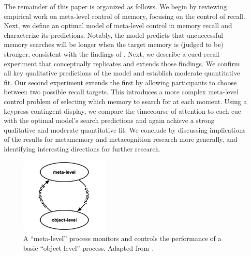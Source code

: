 The remainder of this paper is organized as follows. We begin by reviewing empirical work on meta-level control of memory, focusing on the control of recall. Next, we define an optimal model of meta-level control in memory recall and characterize its predictions. Notably, the model predicts that uncuccessful memory searches will be longer when the target memory is (judged to be) stronger, consistent with the findings of \citet{costermans1992confidence}. Next, we describe a cued-recall experiment that conceptually replicates and extends those findings. We confirm all key qualitative predictions of the model and establish moderate quantitative fit. Our second experiment extends the first by allowing participants to choose between two possible recall targets. This introduces a more complex meta-level control problem of selecting which memory to search for at each moment. Using a keypress-contingent display, we compare the timecourse of attention to each cue with the optimal model's search predictions and again achieve a strong qualitative and moderate quantitative fit. We conclude by discussing implications of the results for metamemory and metacognition research more generally, and identifying interesting directions for further research.

\begin{figure}
  \centering
  \includegraphics[width=0.4\textwidth]{figs/memory/nelson.pdf}
  \caption{ A ``meta-level'' process monitors and controls the performance of a basic ``object-level'' process. Adapted from \citetnelson{}.}
  \label{fig:nelson}
\end{figure}


